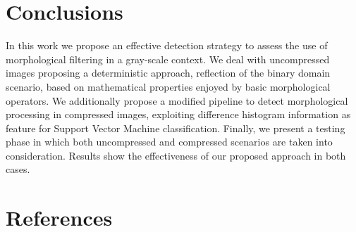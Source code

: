 \documentclass[review]{elsarticle}
\begin{document}
\section{Conclusions}
In this work we propose an effective detection strategy to assess the use of morphological filtering in a gray-scale context. We deal with uncompressed images proposing a deterministic approach, reflection of the binary domain scenario, based on mathematical properties enjoyed by basic morphological operators. We additionally propose a modified pipeline to detect morphological processing in compressed images, exploiting difference histogram information as feature for Support Vector Machine classification. Finally, we present a testing phase in which both uncompressed and compressed scenarios are taken into consideration. Results show the effectiveness of our proposed approach in both cases.  


\section*{References}


\end{document}
